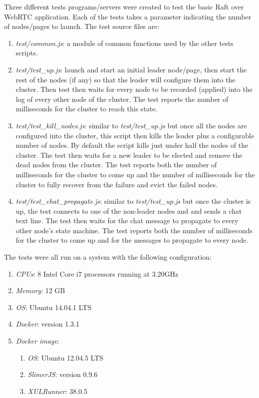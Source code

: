 \documentclass[conference,compsoc]{./IEEEtran/IEEEtran}
\begin{document}
Three different tests programs/servers were created to test the basic
Raft over WebRTC application. Each of the tests takes a parameter
indicating the number of nodes/pages to launch. The test
source files are:

\begin{enumerate}
    \item \emph{test/common.js}: a module of common functions used by
        the other tests scripts.
    \item \emph{test/test\_up.js}: launch and start an initial leader
        node/page, then start the rest of the nodes (if any) so that
        the leader will configure them into the cluster. Then test
        then waits for every node to be recorded (applied) into the log
        of every other node of the cluster. The test reports the
        number of milliseconds for the cluster to reach this state.
    \item \emph{test/test\_kill\_nodes.js}: similar to
        \emph{test/test\_up.js} but once all the nodes are configured
        into the cluster, this script then kills the leader plus
        a configurable number of nodes. By default the script kills
        just under half the nodes of the cluster. The test then waits
        for a new leader to be elected and remove the dead nodes from
        the cluster. The test reports both the number of milliseconds
        for the cluster to come up and the number of milliseconds for
        the cluster to fully recover from the failure and evict the
        failed nodes.
    \item \emph{test/test\_chat\_propagate.js}: similar to
        \emph{test/test\_up.js} but once the cluster is up, the test
        connects to one of the non-leader nodes and and sends a chat
        text line. The test then waits for the chat message to
        propagate to every other node's state machine. The test
        reports both the number of milliseconds for the cluster to
        come up and for the messages to propagate to every node.
\end{enumerate}

The tests were all run on a system with the following configuration:

\begin{enumerate}
    \item \emph{CPUs}: 8 Intel Core i7 processors running at 3.20GHz
    \item \emph{Memory}: 12 GB
    \item \emph{OS}: Ubuntu 14.04.1 LTS
    \item \emph{Docker}: version 1.3.1
    \item \emph{Docker image}:
    \begin{enumerate}
        \item \emph{OS}: Ubuntu 12.04.5 LTS
        \item \emph{SlimerJS}: version 0.9.6
        \item \emph{XULRunner}: 38.0.5
    \end{enumerate}
\end{enumerate}
\end{document}
